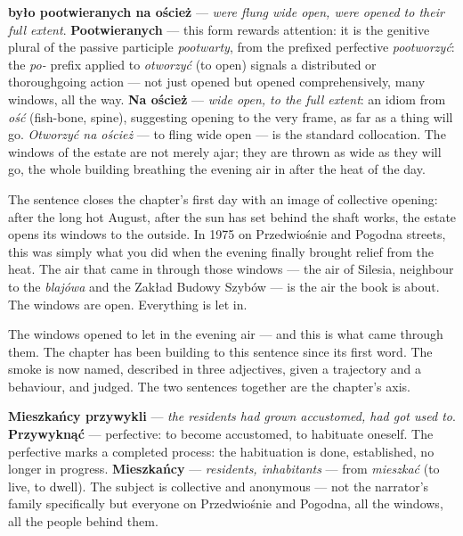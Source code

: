 \textbf{było pootwieranych na oścież} --- \textit{were
flung wide open, were opened to their full extent}.
\textbf{Pootwieranych} --- this form rewards attention:
it is the genitive plural of the passive participle
\textit{pootwarty}, from the prefixed perfective
\textit{pootworzyć}: the \textit{po-} prefix applied
to \textit{otworzyć} (to open) signals a distributed
or thoroughgoing action --- not just opened but opened
comprehensively, many windows, all the way.
\textbf{Na oścież} --- \textit{wide open, to the full
extent}: an idiom from \textit{ość} (fish-bone,
spine), suggesting opening to the very frame, as far
as a thing will go. \textit{Otworzyć na oścież} ---
to fling wide open --- is the standard collocation.
The windows of the estate are not merely ajar; they
are thrown as wide as they will go, the whole building
breathing the evening air in after the heat of the day.

\medskip
The sentence closes the chapter's first day with
an image of collective opening: after the long hot
August, after the sun has set behind the shaft works,
the estate opens its windows to the outside. In 1975
on Przedwiośnie and Pogodna streets, this was simply
what you did when the evening finally brought relief
from the heat. The air that came in through those
windows --- the air of Silesia, neighbour to the
\textit{blajówa} and the Zakład Budowy Szybów ---
is the air the book is about. The windows are open.
Everything is let in.



The windows opened to let in the evening air --- and
this is what came through them. The chapter has been
building to this sentence since its first word. The
smoke is now named, described in three adjectives,
given a trajectory and a behaviour, and judged. The
two sentences together are the chapter's axis.

\textbf{Mieszkańcy przywykli} --- \textit{the
residents had grown accustomed, had got used to}.
\textbf{Przywyknąć} --- perfective: to become
accustomed, to habituate oneself. The perfective
marks a completed process: the habituation is done,
established, no longer in progress. \textbf{Mieszkańcy}
--- \textit{residents, inhabitants} --- from
\textit{mieszkać} (to live, to dwell). The subject
is collective and anonymous --- not the narrator's
family specifically but everyone on Przedwiośnie
and Pogodna, all the windows, all the people behind
them.

